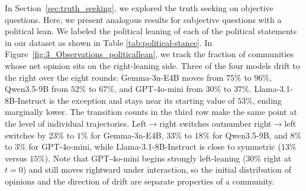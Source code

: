 In Section~\ref{sec:truth_seeking}, we explored the truth seeking on objective questions. Here, we present analogous results for subjective questions with a political lean. We labeled the political leaning of each of the political statements in our dataset as shown in Table \ref{tab:political-stance}. In Figure~\ref{fig:3_Observations_politicallean}, we track the fraction of communities whose net opinion sits on the right-leaning side. Three of the four models drift to the right over the eight rounds: Gemma-3n-E4B moves from $75\%$ to $96\%$, Qwen3.5-9B from $52\%$ to $67\%$, and GPT-4o-mini from $30\%$ to $37\%$. Llama-3.1-8B-Instruct is the exception and stays near its starting value of $53\%$, ending marginally lower. The transition counts in the third row make the same point at the level of individual trajectories. Left$\to$right switches outnumber right$\to$left switches by $23\%$ to $1\%$ for Gemma-3n-E4B, $33\%$ to $18\%$ for Qwen3.5-9B, and $8\%$ to $3\%$ for GPT-4o-mini, while Llama-3.1-8B-Instruct is close to symmetric ($13\%$ versus $15\%$). Note that GPT-4o-mini begins strongly left-leaning ($30\%$ right at $t=0$) and still moves rightward under interaction, so the initial distribution of opinions and the direction of drift are separate properties of a community.



\newcommand{\lleft}{\textcolor{leanleft}{left}}
\newcommand{\lright}{\textcolor{leanright}{right}}
\newcommand{\lnone}{---}


